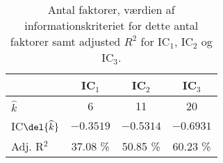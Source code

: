 \begin{table}[h]
\center
\begin{tabular}{lccc}
\toprule
& IC$_1$ & IC$_2$ & IC$_3$ \\ \midrule
$\widehat{k}$ & 6 & 11 & 20 \\ 
IC$\del{\widehat{k}}$ & $-0.3519$  & $-0.5314$ & $-0.6931$  \\
Adj. R$^2$ & 37.08 \% & 50.85 \% & 60.23 \% \\ \bottomrule
 \end{tabular}
\caption{Antal faktorer, værdien af informationskriteriet for dette antal faktorer samt adjusted \(R^2\) for IC$_1$, IC$_2$ og IC$_3$.} \label{tab:est_faktor}
\end{table}